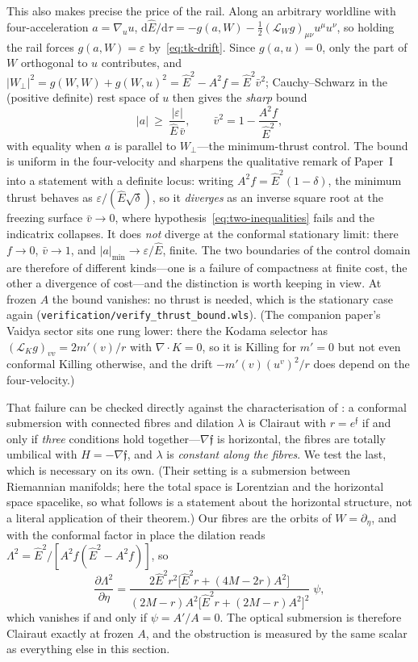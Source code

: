 \documentclass[12pt]{iopart}
\theoremstyle{plain}
\theoremstyle{definition}
\theoremstyle{remark}
\newcommand{\Ehat}{\hat E}
\newcommand{\dd}{\mathrm{d}}
\begin{document}
This also makes precise the price of the rail. Along an arbitrary worldline with
four-acceleration $a=\nabla_uu$,
$\dd\Ehat/\dd\tau=-g(a,W)-\tfrac12(\mathcal L_Wg)_{\mu\nu}u^\mu u^\nu$, so
holding the rail forces $g(a,W)=\varepsilon$ by~\eqref{eq:tk-drift}. Since
$g(a,u)=0$, only the part of $W$ orthogonal to $u$ contributes, and
$|W_\perp|^2=g(W,W)+g(W,u)^2=\Ehat^2-A^2f=\Ehat^2\bar v^2$; Cauchy--Schwarz in
the (positive definite) rest space of $u$ then gives the \emph{sharp} bound
\begin{equation}
    |a|\ \ge\ \frac{|\varepsilon|}{\Ehat\,\bar v},
    \qquad \bar v^2=1-\frac{A^2f}{\Ehat^2},
    \label{eq:thrust-bound}
\end{equation}
with equality when $a$ is parallel to $W_\perp$---the minimum-thrust control.
The bound is uniform in the four-velocity and sharpens the qualitative remark of
Paper~I into a statement with a definite locus: writing $A^2f=\Ehat^2(1-\delta)$,
the minimum thrust behaves as $\varepsilon/(\Ehat\sqrt\delta)$, so it
\emph{diverges} as an inverse square root at the freezing surface $\bar v\to0$,
where hypothesis~\eqref{eq:two-inequalities} fails and the indicatrix collapses.
It does \emph{not} diverge at the conformal stationary limit: there $f\to0$,
$\bar v\to1$, and $|a|_{\min}\to\varepsilon/\Ehat$, finite. The two boundaries of
the control domain are therefore of different kinds---one is a failure of
compactness at finite cost, the other a divergence of cost---and the distinction
is worth keeping in view. At frozen $A$ the bound vanishes: no thrust is needed,
which is the stationary case again
(\texttt{verification/verify\_thrust\_bound.wls}). (The companion paper's Vaidya
sector sits one rung lower: there the Kodama selector has
$(\mathcal L_Kg)_{vv}=2m'(v)/r$ with $\nabla\!\cdot\!K=0$, so it is Killing for
$m'=0$ but not even conformal Killing otherwise, and the drift
$-m'(v)(u^v)^2/r$ does depend on the four-velocity.)

That failure can be checked directly against the characterisation of
\cite{MeenaZawadzki2024}: a conformal submersion with connected fibres and
dilation $\lambda$ is Clairaut with $r=e^{\mathfrak f}$ if and only if
\emph{three} conditions hold together---$\nabla\mathfrak f$ is horizontal, the
fibres are totally umbilical with $H=-\nabla\mathfrak f$, and $\lambda$ is
\emph{constant along the fibres}. We test the last, which is necessary on its
own. (Their setting is a submersion between Riemannian manifolds; here the total
space is Lorentzian and the horizontal space spacelike, so what follows is a
statement about the horizontal structure, not a literal application of their
theorem.) Our fibres are the orbits of
$W=\partial_\eta$, and with the conformal factor in place the dilation reads
$\Lambda^2=\Ehat^2/[A^2f(\Ehat^2-A^2f)]$, so
\begin{equation}
    \frac{\partial\Lambda^2}{\partial\eta}
      =\frac{2\Ehat^2r^2\big[\Ehat^2r+(4M-2r)A^2\big]}
             {(2M-r)A^2\big[\Ehat^2r+(2M-r)A^2\big]^2}\;\psi ,
    \label{eq:dilation-fibre}
\end{equation}
which vanishes if and only if $\psi=A'/A=0$. The optical submersion is therefore
Clairaut exactly at frozen $A$, and the obstruction is measured by the same
scalar as everything else in this section.
\end{document}
